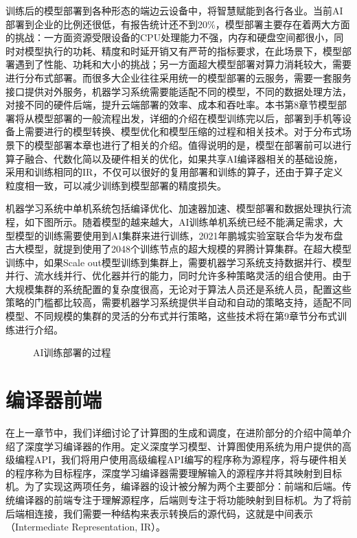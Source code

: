 \documentclass[letterpaper,10pt,english]{sphinxmanual}
\begin{document}
\sphinxAtStartPar
训练后的模型部署到各种形态的端边云设备中，将智慧赋能到各行各业。当前AI部署到企业的比例还很低，有报告统计还不到20\%，模型部署主要存在着两大方面的挑战：一方面资源受限设备的CPU处理能力不强，内存和硬盘空间都很小，同时对模型执行的功耗、精度和时延开销又有严苛的指标要求，在此场景下，模型部署遇到了性能、功耗和大小的挑战；另一方面超大模型部署对算力消耗较大，需要进行分布式部署。而很多大企业往往采用统一的模型部署的云服务，需要一套服务接口提供对外服务，机器学习系统需要能适配不同的模型，不同的数据处理方法，对接不同的硬件后端，提升云端部署的效率、成本和吞吐率。本书第8章节模型部署将从模型部署的一般流程出发，详细的介绍在模型训练完以后，部署到手机等设备上需要进行的模型转换、模型优化和模型压缩的过程和相关技术。对于分布式场景下的模型部署本章也进行了相关的介绍。值得说明的是，模型在部署前可以进行算子融合、代数化简以及硬件相关的优化，如果共享AI编译器相关的基础设施，采用和训练相同的IR，不仅可以很好的复用部署和训练的算子，还由于算子定义粒度相一致，可以减少训练到模型部署的精度损失。

\sphinxAtStartPar
机器学习系统中单机系统包括编译优化、加速器加速、模型部署和数据处理执行流程，如下图所示。随着模型的越来越大，AI训练单机系统已经不能满足需求，大型模型的训练需要使用到AI集群来进行训练，2021年鹏城实验室联合华为发布盘古大模型，就提到使用了2048个训练节点的超大规模的昇腾计算集群。在超大模型训练中，如果Scale
out模型训练到集群上，需要机器学习系统支持数据并行、模型并行、流水线并行、优化器并行的能力，同时允许多种策略灵活的组合使用。由于大规模集群的系统配置的复杂度很高，无论对于算法人员还是系统人员，配置这些策略的门槛都比较高，需要机器学习系统提供半自动和自动的策略支持，适配不同模型、不同规模的集群的灵活的分布式并行策略，这些技术将在第9章节分布式训练进行介绍。

\begin{figure}[H]
\centering
\capstart

\noindent{}
\caption{AI训练部署的过程}\label{\detokenize{chapter_preface_advanced/index:id7}}\end{figure}


\chapter{编译器前端}
\label{\detokenize{chapter_frontend_and_ir/index:id1}}\label{\detokenize{chapter_frontend_and_ir/index::doc}}
\sphinxAtStartPar
在上一章节中，我们详细讨论了计算图的生成和调度，在进阶部分的介绍中简单介绍了深度学习编译器的作用。定义深度学习模型、计算图使用系统为用户提供的高级编程API，我们将用户使用高级编程API编写的程序称为源程序，将与硬件相关的程序称为目标程序，深度学习编译器需要理解输入的源程序并将其映射到目标机。为了实现这两项任务，编译器的设计被分解为两个主要部分：前端和后端。传统编译器的前端专注于理解源程序，后端则专注于将功能映射到目标机。为了将前后端相连接，我们需要一种结构来表示转换后的源代码，这就是中间表示（Intermediate
Representation, IR）。
\end{document}
